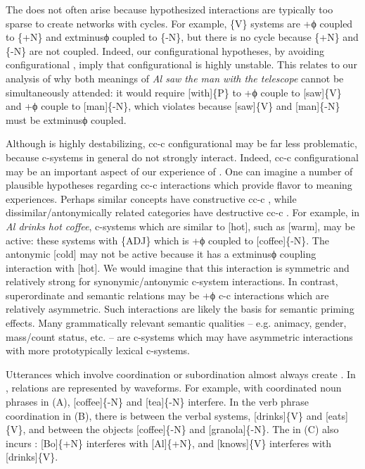   The  does not often arise because hypothesized  interactions are typically too sparse to create networks with cycles. For example,  \{V\} systems are +ϕ coupled to \{+N\} and 	extminus{}ϕ coupled to \{-N\}, but there is no cycle because \{+N\} and \{-N\} are not coupled. Indeed, our configurational hypotheses, by avoiding configurational , imply that configurational  is highly unstable. This relates to our analysis of why both meanings of \textit{Al saw the man with the telescope} cannot be simultaneously attended: it would require [with]\{P\} to +ϕ couple to [saw]\{V\} and +ϕ couple to [man]\{-N\}, which violates  because [saw]\{V\} and [man]\{-N\} must be 	extminus{}ϕ coupled. 

  Although  is highly destabilizing, cc-c configurational  may be far less problematic, because c-systems in general do not strongly interact. Indeed, cc-c configurational  may be an important aspect of our experience of . One can imagine a number of plausible hypotheses regarding cc-c interactions which provide flavor to meaning experiences. Perhaps similar concepts have constructive cc-c , while dissimilar/antonymically related categories have destructive cc-c . For example, in \textit{Al drinks hot coffee}, c-systems which are similar to [hot], such as [warm], may be active: these systems  with \{\textsc{ADJ}\} which is +ϕ coupled to [coffee]\{-N\}. The antonymic [cold] may not be active because it has a 	extminus{}ϕ coupling interaction with [hot]. We would imagine that this interaction is symmetric and relatively strong for synonymic/antonymic c-system interactions. In contrast, superordinate and  semantic relations may be +ϕ c-c interactions which are relatively asymmetric. Such interactions are likely the basis for semantic priming effects. Many grammatically relevant semantic qualities -- e.g. animacy, gender, mass/count status, etc. -- are c-systems which may have asymmetric interactions with more prototypically lexical c-systems.

  Utterances which involve coordination or subordination almost always create  . In {},  relations are represented by waveforms. For example, with coordinated noun phrases in (A), [coffee]\{-N\} and [tea]\{-N\} interfere. In the verb phrase coordination in (B), there is  between the verbal systems, [drinks]\{V\} and [eats]\{V\}, and between the objects [coffee]\{-N\} and [granola]\{-N\}. The  in (C) also incurs : [Bo]\{+N\} interferes with [Al]\{+N\}, and [knows]\{V\} interferes with [drinks]\{V\}.


